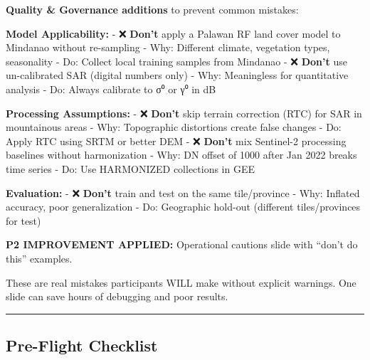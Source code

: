 \documentclass[
  letterpaper,
  DIV=11,
  numbers=noendperiod]{scrartcl}
\begin{document}
\begin{tcolorbox}[enhanced jigsaw, left=2mm, opacityback=0, toprule=.15mm, breakable, title=\textcolor{quarto-callout-warning-color}{\faExclamationTriangle}\hspace{0.5em}{``Don't Do This'' - Common Pitfalls}, colbacktitle=quarto-callout-warning-color!10!white, arc=.35mm, titlerule=0mm, colback=white, bottomtitle=1mm, colframe=quarto-callout-warning-color-frame, leftrule=.75mm, toptitle=1mm, rightrule=.15mm, bottomrule=.15mm, opacitybacktitle=0.6, coltitle=black]

\textbf{Quality \& Governance additions} to prevent common mistakes:

\end{tcolorbox}

\textbf{Model Applicability:} - ❌ \textbf{Don't} apply a Palawan RF
land cover model to Mindanao without re-sampling - Why: Different
climate, vegetation types, seasonality - Do: Collect local training
samples from Mindanao - ❌ \textbf{Don't} use un-calibrated SAR (digital
numbers only) - Why: Meaningless for quantitative analysis - Do: Always
calibrate to σ⁰ or γ⁰ in dB

\textbf{Processing Assumptions:} - ❌ \textbf{Don't} skip terrain
correction (RTC) for SAR in mountainous areas - Why: Topographic
distortions create false changes - Do: Apply RTC using SRTM or better
DEM - ❌ \textbf{Don't} mix Sentinel-2 processing baselines without
harmonization - Why: DN offset of 1000 after Jan 2022 breaks time series
- Do: Use HARMONIZED collections in GEE

\textbf{Evaluation:} - ❌ \textbf{Don't} train and test on the same
tile/province - Why: Inflated accuracy, poor generalization - Do:
Geographic hold-out (different tiles/provinces for test)

\textbf{P2 IMPROVEMENT APPLIED:} Operational cautions slide with ``don't
do this'' examples.

These are real mistakes participants WILL make without explicit
warnings. One slide can save hours of debugging and poor results.

\begin{center}\rule{0.5\linewidth}{0.5pt}\end{center}

\subsection{Pre-Flight Checklist}\label{pre-flight-checklist}
\end{document}
